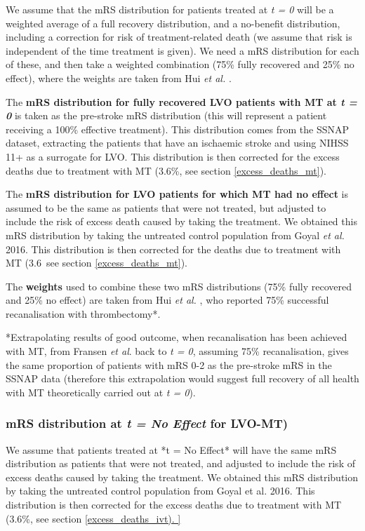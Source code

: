 {We assume that the mRS distribution for patients treated at \textit{t = 0} will be a weighted average of a full recovery distribution, and a no-benefit distribution, including a correction for risk of treatment-related death (we assume that risk is independent of the time treatment is given). We need a mRS distribution for each of these, and then take a weighted combination (75\% fully recovered and 25\% no effect), where the weights are taken from Hui\textit{ et al.} \cite{hui_efficacy_2020}.

The \textbf{mRS distribution for fully recovered LVO patients with MT at \textit{t = 0}} is taken as the pre-stroke mRS distribution (this will represent a patient receiving a 100\% effective treatment). This distribution comes from the SSNAP dataset, extracting the patients that have an ischaemic stroke and using NIHSS 11+ as a surrogate for LVO. This distribution is then corrected for the excess deaths due to treatment with MT (3.6\%, see section \ref{excess_deaths_mt}).

The \textbf{mRS distribution for LVO patients for which MT had no effect} is assumed to be the same as patients that were not treated, but adjusted to include the risk of excess death caused by taking the treatment. We obtained this mRS distribution by taking the untreated control population from Goyal \textit{et al.} 2016. This distribution is then corrected for the deaths due to treatment with MT (3.6\, see section \ref{excess_deaths_mt}).

The \textbf{weights} used to combine these two mRS distributions (75\% fully recovered and 25\% no effect) are taken from Hui \textit{et al.} \cite{hui_efficacy_2020}, who reported 75\% successful recanalisation with thrombectomy*.

*Extrapolating results of good outcome, when recanalisation has been achieved with MT, from Fransen \textit{et al}. \cite{fransen_time_2016} back to\textit{ t = 0}, assuming 75\% recanalisation, gives the same proportion of patients with mRS 0-2 as the pre-stroke mRS in the SSNAP data (therefore this extrapolation would suggest full recovery of all health with MT theoretically carried out at \textit{t = 0}).

\subsubsection{mRS distribution at \textit{t = No Effect} for LVO-MT)}

We assume that patients treated at *t = No Effect* will have the same mRS distribution as patients that were not treated, and adjusted to include the risk of excess deaths caused by taking the treatment. We obtained this mRS distribution by taking the untreated control population from Goyal et al. 2016. This distribution is then corrected for the excess deaths due to treatment with MT (3.6\%, see section \ref{excess_deaths_ivt).

}}
